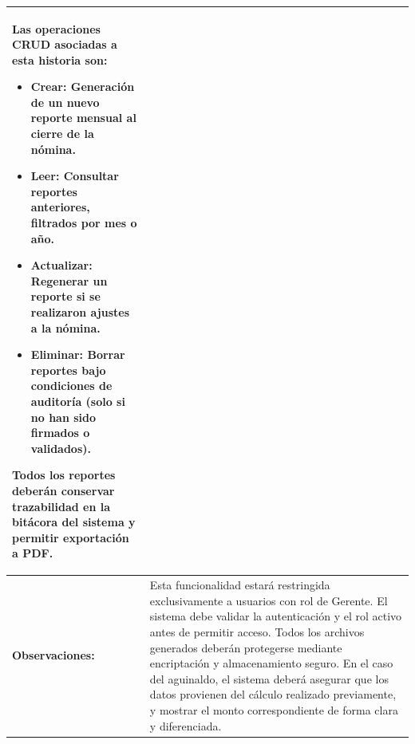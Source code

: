 \begin{table}[h]
\begin{tabular}{|p{5cm}|p{10cm}|}
		Las operaciones CRUD asociadas a esta historia son:
		\begin{itemize}
			\item \textbf{Crear:} Generación de un nuevo reporte mensual al cierre de la nómina.
			\item \textbf{Leer:} Consultar reportes anteriores, filtrados por mes o año.
			\item \textbf{Actualizar:} Regenerar un reporte si se realizaron ajustes a la nómina.
			\item \textbf{Eliminar:} Borrar reportes bajo condiciones de auditoría (solo si no han sido firmados o validados).
		\end{itemize}
		Todos los reportes deberán conservar trazabilidad en la bitácora del sistema y permitir exportación a PDF.
		\\ \hline
		\textbf{Observaciones:}                   &
		Esta funcionalidad estará restringida exclusivamente a usuarios con rol de Gerente. El sistema debe validar la autenticación y el rol activo antes de permitir acceso. Todos los archivos generados deberán protegerse mediante encriptación y almacenamiento seguro. En el caso del aguinaldo, el sistema deberá asegurar que los datos provienen del cálculo realizado previamente, y mostrar el monto correspondiente de forma clara y diferenciada.
		\\ \hline
	\end{tabular}
\end{table}


